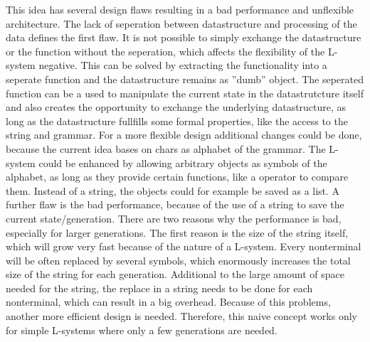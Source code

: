 \documentclass[english]{cpp-hmwk}
\begin{document}
\medskip
\noindent This idea has several design flaws resulting in a bad performance and unflexible architecture. The lack of seperation between datastructure and processing of the data defines the first flaw. It is not possible to simply exchange the datastructure or the function without the seperation, which affects the flexibility of the L-system negative. This can be solved by extracting the functionality into a seperate function and the datastructure remains as ''dumb'' object. The seperated function can be a used to manipulate the current state in the datastrutcture itself and also creates the opportunity to exchange the underlying datastructure, as long as the datastructure fullfills some formal properties, like the access to the string and grammar.\newline
For a more flexible design additional changes could be done, because the current idea bases on chars as alphabet of the grammar. The L-system could be enhanced by allowing arbitrary objects as symbols of the alphabet, as long as they provide certain functions, like a operator to compare them. Instead of a string, the objects could for example be saved as a list.\newline
A further flaw is the bad performance, because of the use of a string to save the current state/generation. There are two reasons why the performance is bad, especially for larger generations. The first reason is the size of the string itself, which will grow very fast because of the nature of a L-system. Every nonterminal will be often replaced by several symbols, which enormously increases the total size of the string for each generation. Additional to the large amount of space needed for the string, the replace in a string needs to be done for each nonterminal, which can result in a big overhead. Because of this problems, another more efficient design is needed.\newline
Therefore, this naive concept works only for simple L-systems where only a few generations are needed.
\end{document}
